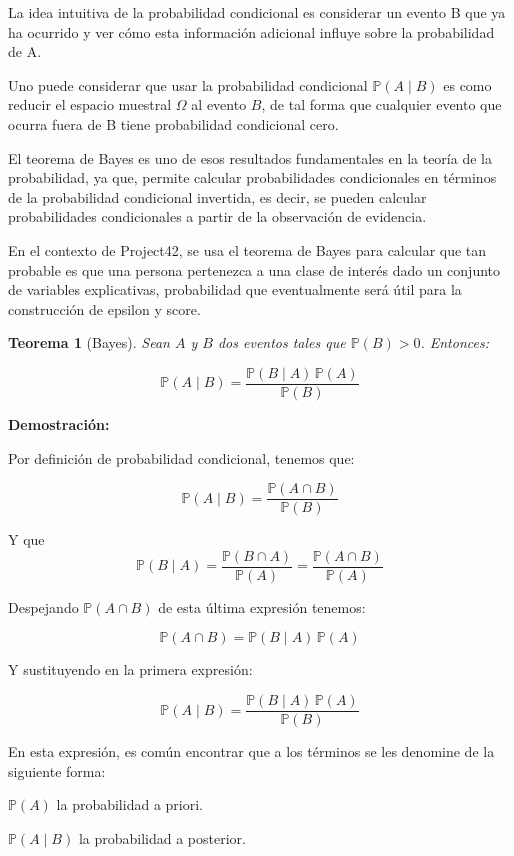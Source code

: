 \documentclass[
 12pt,
 letterpaper,
]{article}
\theoremstyle{teoremaBreak}
\newtheorem{teorema}{Teorema}[section]
\theoremstyle{plain}
\theoremstyle{definition}
\begin{document}
La idea intuitiva de la probabilidad condicional es considerar un evento
B que ya ha ocurrido y ver cómo esta información adicional influye sobre
la probabilidad de A.

Uno puede considerar que usar la probabilidad condicional $\mathbb{P}(A\mid B)$
es como reducir el espacio muestral $\Omega$ al evento $B$, de tal forma que
cualquier evento que ocurra fuera de B tiene probabilidad condicional
cero.

El teorema de Bayes es uno de esos resultados fundamentales en la teoría
de la probabilidad, ya que, permite calcular probabilidades
condicionales en términos de la probabilidad condicional invertida, es
decir, se pueden calcular probabilidades condicionales a partir de la
observación de evidencia.

En el contexto de Project42, se usa el teorema de Bayes para calcular
que tan probable es que una persona pertenezca a una clase de interés
dado un conjunto de variables explicativas, probabilidad que
eventualmente será útil para la construcción de epsilon y score.

\begin{teorema}[Bayes]
Sean $A$ y $B$ dos eventos tales que $\mathbb{P}(B) > 0$. Entonces:

\[
\mathbb{P}(A \mid B) = \dfrac{\mathbb{P}(B \mid A)\,\mathbb{P}(A)}{\mathbb{P}(B)}
\]
\end{teorema}

\textbf{Demostración:}

Por definición de probabilidad condicional, tenemos que:

\[
\mathbb{P}(A \mid B) = \dfrac{\mathbb{P}(A \cap B)}{\mathbb{P}(B)}
\]

Y que
\[
\mathbb{P}(B \mid A) = \dfrac{\mathbb{P}(B \cap A)}{\mathbb{P}(A)} = \dfrac{\mathbb{P}(A \cap B)}{\mathbb{P}(A)}
\]

Despejando $\mathbb{P}(A \cap B)$ de esta última expresión tenemos:

\[
\mathbb{P}(A \cap B) = \mathbb{P}(B \mid A)\,\mathbb{P}(A)
\]

Y sustituyendo en la primera expresión:

\[
\mathbb{P}(A \mid B) = \dfrac{\mathbb{P}(B \mid A)\,\mathbb{P}(A)}{\mathbb{P}(B)}
\]

En esta expresión, es común encontrar que a los términos se les denomine
de la siguiente forma:

$\mathbb{P}(A)$ la probabilidad a priori.

$\mathbb{P}(A \mid B)$ la probabilidad a posterior.
\end{document}
